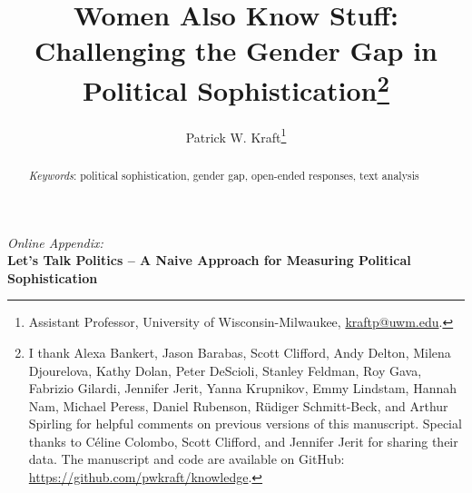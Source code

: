 \documentclass[12pt]{article}
\author{Patrick W. Kraft\footnote{Assistant Professor, University of Wisconsin-Milwaukee, \href{mailto:kraftp@uwm.edu}{kraftp@uwm.edu}.}}
\title{Women Also Know Stuff: \\
\large{Challenging the Gender Gap in Political Sophistication}\footnote{%
I thank Alexa Bankert, Jason Barabas, Scott Clifford, Andy Delton, Milena Djourelova, Kathy Dolan, Peter DeScioli, Stanley Feldman, Roy Gava, Fabrizio Gilardi, Jennifer Jerit, Yanna Krupnikov, Emmy Lindstam, Hannah Nam, Michael Peress, Daniel Rubenson, R\"udiger Schmitt-Beck, and Arthur Spirling for helpful comments on previous versions of this manuscript. Special thanks to C{\'e}line Colombo, Scott Clifford, and Jennifer Jerit for sharing their data. The manuscript and code are available on GitHub: \url{https://github.com/pwkraft/knowledge}.}
} %
\date{}
\begin{document}
\maketitle
\doublespacing
\thispagestyle{empty}


\hfill
\begin{abstract}\singlespacing
\noindent 


\vspace{\baselineskip}
\noindent \textit{Keywords}: political sophistication, gender gap, open-ended responses, text analysis

\vspace{\baselineskip}
\end{abstract}
\hfill

\newpage\setcounter{page}{1}





\clearpage
\singlespacing
\renewcommand\thesubsection{\Roman{subsection}}
\setcounter{page}{1}
\appendices
\textit{Online Appendix:}\\
\textbf{Let's Talk Politics -- A Naive Approach for Measuring Political Sophistication}

\startcontents[sections]
\clearpage


\end{document}
